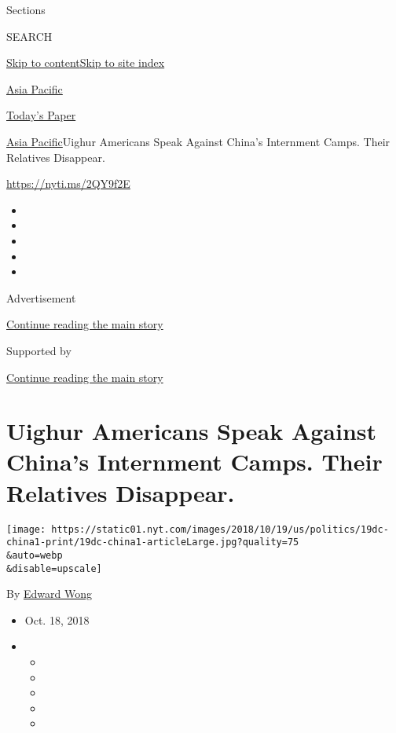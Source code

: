 Sections

SEARCH

\protect\hyperlink{site-content}{Skip to
content}\protect\hyperlink{site-index}{Skip to site index}

\href{https://www.nytimes.com/section/world/asia}{Asia Pacific}

\href{https://myaccount.nytimes.com/auth/login?response_type=cookie\&client_id=vi}{}

\href{https://www.nytimes.com/section/todayspaper}{Today's Paper}

\href{/section/world/asia}{Asia Pacific}\textbar{}Uighur Americans Speak
Against China's Internment Camps. Their Relatives Disappear.

\url{https://nyti.ms/2QY9f2E}

\begin{itemize}
\item
\item
\item
\item
\item
\end{itemize}

Advertisement

\protect\hyperlink{after-top}{Continue reading the main story}

Supported by

\protect\hyperlink{after-sponsor}{Continue reading the main story}

\hypertarget{uighur-americans-speak-against-chinas-internment-camps-their-relatives-disappear}{%
\section{Uighur Americans Speak Against China's Internment Camps. Their
Relatives
Disappear.}\label{uighur-americans-speak-against-chinas-internment-camps-their-relatives-disappear}}

\texttt{[image: https://static01.nyt.com/images/2018/10/19/us/politics/19dc-china1-print/19dc-china1-articleLarge.jpg?quality=75\\\&auto=webp\\\&disable=upscale]}

By \href{https://www.nytimes.com/by/edward-wong}{Edward Wong}

\begin{itemize}
\item
  Oct. 18, 2018
\item
  \begin{itemize}
  \item
  \item
  \item
  \item
  \item
  \end{itemize}
\end{itemize}

